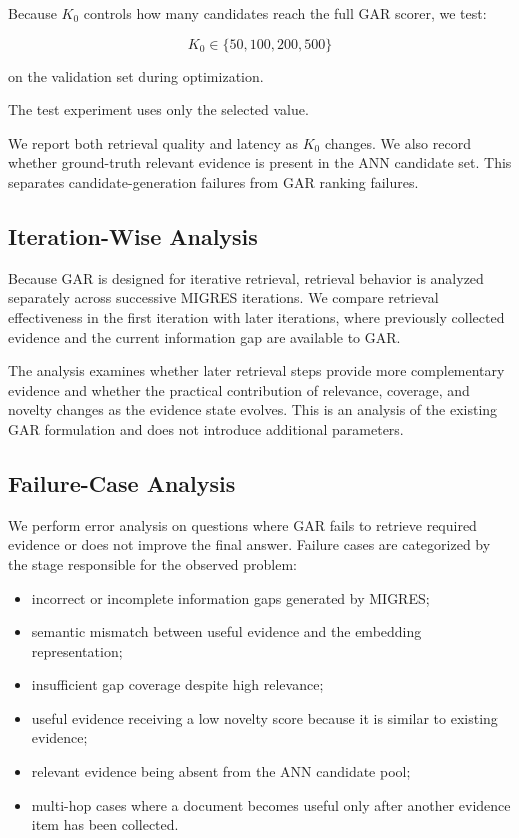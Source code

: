 \documentclass[11pt,a4paper]{article}
\begin{document}
Because $K_0$ controls how many candidates reach the full GAR scorer, we test:

\[
K_0\in\{50,100,200,500\}
\]

on the validation set during optimization.

The test experiment uses only the selected value.

We report both retrieval quality and latency as $K_0$ changes. We also record whether ground-truth relevant evidence is present in the ANN candidate set. This separates candidate-generation failures from GAR ranking failures.

\subsection{Iteration-Wise Analysis}

Because GAR is designed for iterative retrieval, retrieval behavior is analyzed separately across successive MIGRES iterations. We compare retrieval effectiveness in the first iteration with later iterations, where previously collected evidence and the current information gap are available to GAR.

The analysis examines whether later retrieval steps provide more complementary evidence and whether the practical contribution of relevance, coverage, and novelty changes as the evidence state evolves. This is an analysis of the existing GAR formulation and does not introduce additional parameters.

\subsection{Failure-Case Analysis}

We perform error analysis on questions where GAR fails to retrieve required evidence or does not improve the final answer. Failure cases are categorized by the stage responsible for the observed problem:

\begin{itemize}[leftmargin=1.5em]
\item incorrect or incomplete information gaps generated by MIGRES;
\item semantic mismatch between useful evidence and the embedding representation;
\item insufficient gap coverage despite high relevance;
\item useful evidence receiving a low novelty score because it is similar to existing evidence;
\item relevant evidence being absent from the ANN candidate pool;
\item multi-hop cases where a document becomes useful only after another evidence item has been collected.
\end{itemize}
\end{document}
